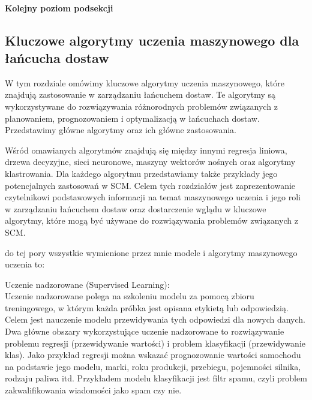 \cite{guo2020}\cite{wiku2023}\cite{wikr2023}\cite{wikma2023}\cite{Naw2009}\cite{Faust2019}\cite{gar2020}\cite{gov2021}\cite{ryb2019}\cite{mat2023}\cite{chen2021}\cite{chmiel2019}\cite{Cada2020}\cite{este2023}\cite{ehn2018}




\paragraph{Kolejny poziom podsekcji}

\newpage
\par
\subsection{Kluczowe algorytmy uczenia maszynowego dla łańcucha dostaw}


W tym rozdziale omówimy kluczowe algorytmy uczenia maszynowego, które znajdują zastosowanie w zarządzaniu łańcuchem dostaw. Te algorytmy są wykorzystywane do rozwiązywania różnorodnych problemów związanych z planowaniem, prognozowaniem i optymalizacją w łańcuchach dostaw. Przedstawimy główne algorytmy oraz ich główne zastosowania.

Wśród omawianych algorytmów znajdują się między innymi regresja liniowa, drzewa decyzyjne, sieci neuronowe, maszyny wektorów nośnych oraz algorytmy klastrowania. Dla każdego algorytmu przedstawiamy także przykłady jego potencjalnych zastosowań w SCM.
Celem tych rozdziałów jest zaprezentowanie czytelnikowi podstawowych informacji na temat maszynowego uczenia i jego roli w zarządzaniu łańcuchem dostaw oraz dostarczenie wglądu w kluczowe algorytmy, które mogą być używane do rozwiązywania problemów związanych z SCM.

do tej pory wszystkie wymienione przez mnie modele i algorytmy maszynowego uczenia to:


Uczenie nadzorowane (Supervised Learning):\\
Uczenie nadzorowane polega na szkoleniu modelu za pomocą zbioru treningowego, w którym każda próbka jest opisana etykietą lub odpowiedzią. Celem jest nauczenie modelu przewidywania tych odpowiedzi dla nowych danych. Dwa główne obszary wykorzystujące uczenie nadzorowane to rozwiązywanie problemu regresji (przewidywanie wartości) i problem klasyfikacji (przewidywanie klas). Jako przykład regresji można wskazać prognozowanie wartości samochodu na podstawie jego modelu, marki, roku produkcji, przebiegu, pojemności silnika, rodzaju paliwa itd. Przykładem modelu klasyfikacji jest filtr spamu, czyli problem zakwalifikowania wiadomości jako spam czy nie. \\\\



